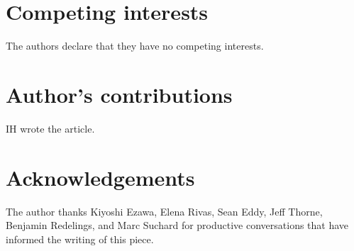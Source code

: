 \documentclass{bmcart}
\begin{document}
\begin{backmatter}

\section*{Competing interests}
  The authors declare that they have no competing interests.

\section*{Author's contributions}
    IH wrote the article.

\section*{Acknowledgements}
  The author thanks Kiyoshi Ezawa, Elena Rivas, Sean Eddy, Jeff Thorne,
  Benjamin Redelings, and Marc Suchard
  for productive conversations that have informed the writing of this piece.




\end{backmatter}
\end{document}
